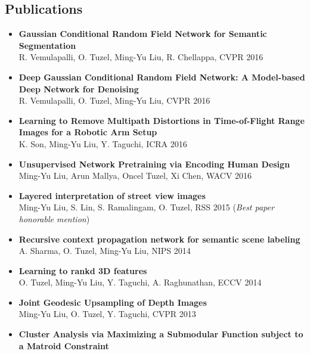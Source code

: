 \documentclass[10pt,letterpaper]{article}
\begin{document}
\subsection*{Publications}
\begin{itemize}
\item {\bf Gaussian Conditional Random Field Network for Semantic Segmentation}\\
      R. Vemulapalli, O. Tuzel, Ming-Yu Liu, R. Chellappa, CVPR 2016\vspace{-2mm}
\item {\bf Deep Gaussian Conditional Random Field Network: A Model-based Deep Network for Denoising}\\
      R. Vemulapalli, O. Tuzel, Ming-Yu Liu, CVPR 2016\vspace{-2mm}
\item {\bf Learning to Remove Multipath Distortions in Time-of-Flight Range Images for a Robotic Arm Setup}\\
      K. Son, Ming-Yu Liu, Y. Taguchi, ICRA 2016\vspace{-2mm}
\item {\bf Unsupervised Network Pretraining via Encoding Human Design}\\
      Ming-Yu Liu, Arun Mallya, Oncel Tuzel, Xi Chen, WACV 2016\vspace{-2mm}
\item {\bf Layered interpretation of street view images}\\
      Ming-Yu Liu, S. Lin, S. Ramalingam, O. Tuzel, RSS 2015 ({\it Best paper honorable mention})\vspace{-2mm}
\item {\bf Recursive context propagation network for semantic scene labeling}\\
			A. Sharma, O. Tuzel, {Ming-Yu Liu}, {NIPS} 2014\vspace{-2mm}
\item {\bf Learning to rankd 3D features}\\
			O. Tuzel, {Ming-Yu Liu}, Y. Taguchi, A. Raghunathan, {ECCV} 2014\vspace{-2mm}
\item {\bf Joint Geodesic Upsampling of Depth Images}\\      
      {Ming-Yu Liu}, O. Tuzel, Y. Taguchi, {CVPR} 2013\vspace{-2mm}
\item {\bf Cluster Analysis via Maximizing a Submodular Function subject to a Matroid Constraint}\\

\end{itemize}
\end{document}
